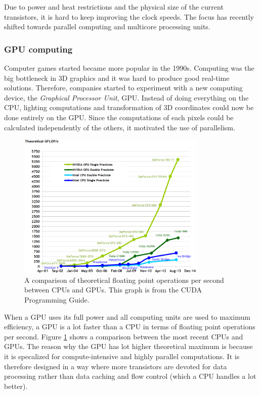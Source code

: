 Due to power and heat restrictions and the physical size of the current transistors, it is hard to keep improving the clock speeds. The focus has recently shifted towards parallel computing and multicore processing units.

\subsubsection{GPU computing}

Computer games started became more popular in the 1990s. Computing was the big bottleneck in 3D graphics and it was hard to produce good real-time solutions. Therefore, companies started to experiment with a new computing device, the \emph{Graphical Processor Unit}, GPU. Instead of doing everything on the CPU, lighting computations and transformation of 3D coordinates could now be done entirely on the GPU. Since the computations of each pixels could be calculated independently of the others, it motivated the use of parallelism. 

\begin{figure}[ht!]
\centering
\includegraphics[width=90mm]{img/flops.png}
\caption{A comparison of theoretical floating point operations per second between CPUs and GPUs. This graph is from the CUDA Programming Guide\cite{cudapguide}.}
\label{flops}
\end{figure}

When a GPU uses its full power and all computing units are used to maximum efficiency, a GPU is a lot faster than a CPU in terms of floating point operations per second. Figure \ref{flops} shows a comparison between the most recent CPUs and GPUs. The reason why the GPU has lot higher theoretical maximum is because it is specalized for compute-intensive and highly parallel computations. It is therefore designed in a way where more transistors are devoted for data processing rather than data caching and flow control (which a CPU handles a lot better)\cite{cudaexample}. 
